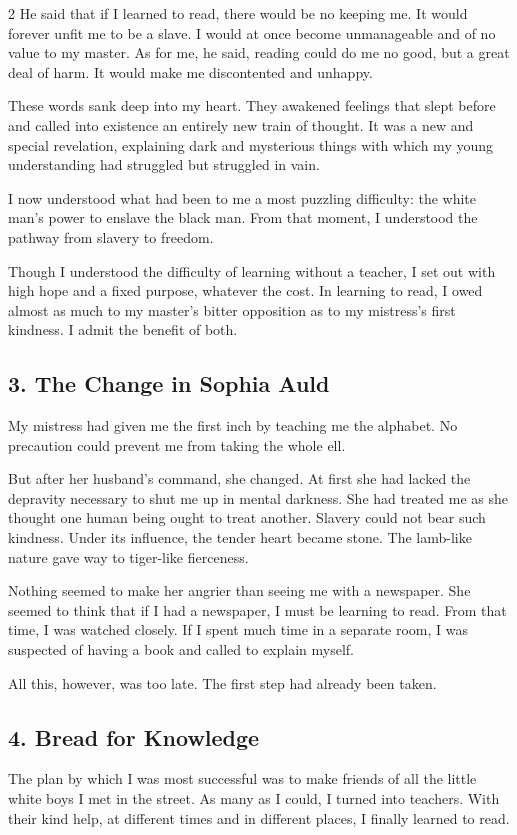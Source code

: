 \documentclass[12pt]{article}
\begin{document}
\begin{multicols}{2}
He said that if I learned to read, there would be no keeping me. It would forever unfit me to be a slave. I would at once become unmanageable and of no value to my master. As for me, he said, reading could do me no good, but a great deal of harm. It would make me discontented and unhappy.

These words sank deep into my heart. They awakened feelings that slept before and called into existence an entirely new train of thought. It was a new and special revelation, explaining dark and mysterious things with which my young understanding had struggled but struggled in vain.

I now understood what had been to me a most puzzling difficulty: the white man's power to enslave the black man. From that moment, I understood the pathway from slavery to freedom.

Though I understood the difficulty of learning without a teacher, I set out with high hope and a fixed purpose, whatever the cost. In learning to read, I owed almost as much to my master's bitter opposition as to my mistress's first kindness. I admit the benefit of both.

\subsection*{3. The Change in Sophia Auld}
My mistress had given me the first inch by teaching me the alphabet. No precaution could prevent me from taking the whole ell.

But after her husband's command, she changed. At first she had lacked the depravity necessary to shut me up in mental darkness. She had treated me as she thought one human being ought to treat another. Slavery could not bear such kindness. Under its influence, the tender heart became stone. The lamb-like nature gave way to tiger-like fierceness.

Nothing seemed to make her angrier than seeing me with a newspaper. She seemed to think that if I had a newspaper, I must be learning to read. From that time, I was watched closely. If I spent much time in a separate room, I was suspected of having a book and called to explain myself.

All this, however, was too late. The first step had already been taken.

\subsection*{4. Bread for Knowledge}
The plan by which I was most successful was to make friends of all the little white boys I met in the street. As many as I could, I turned into teachers. With their kind help, at different times and in different places, I finally learned to read.


\end{multicols}
\end{document}

